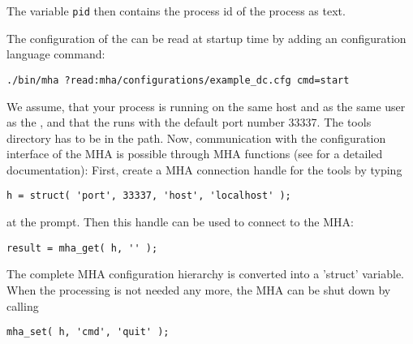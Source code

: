 The variable \verb!pid! then contains the process id of the \mhad{} process as text.

The configuration of the \mhad{} can be
read at startup time by adding an \mha{} configuration language command:
%
\begin{verbatim}
./bin/mha ?read:mha/configurations/example_dc.cfg cmd=start
\end{verbatim}
%
We assume, that your \Matlab{} process is running on the same host and
as the same user as the \mha{}, and that the \mhad{} runs with the
default port number 33337.
%
The \mha{} \Matlab{} tools directory has to be in the \Matlab{} path.
%
Now, communication with the configuration interface of the MHA is
possible through MHA \Matlab{} functions (see 
for a detailed documentation):
%
First, create a MHA connection handle for the \Matlab{} tools by
typing
\begin{verbatim}
h = struct( 'port', 33337, 'host', 'localhost' );
\end{verbatim}
at the \Matlab{} prompt. Then this handle can be used to connect to
the MHA:
%
\begin{verbatim}
result = mha_get( h, '' );
\end{verbatim}
%
The complete MHA configuration hierarchy is converted into a \Matlab{}
'struct' variable.
%
When the \mha{} processing is not needed any more, the MHA can be shut
down by calling
%
\begin{verbatim}
mha_set( h, 'cmd', 'quit' );
\end{verbatim}


